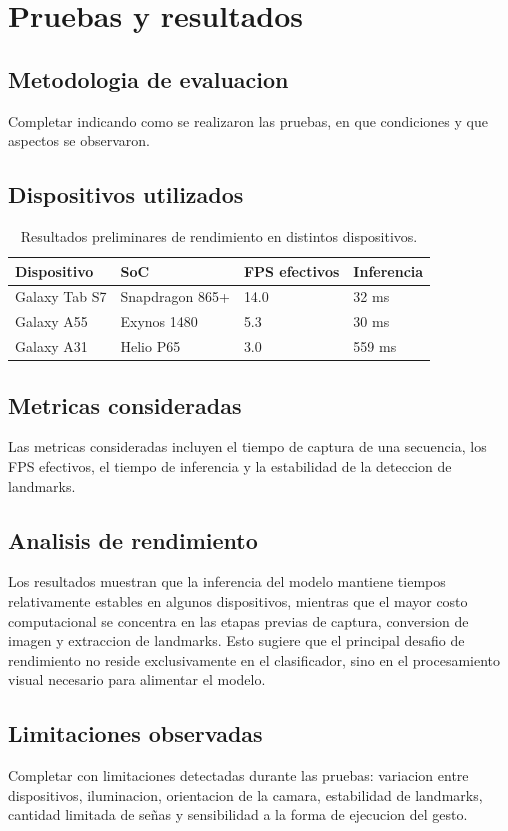 \chapter{Pruebas y resultados}

\section{Metodologia de evaluacion}

Completar indicando como se realizaron las pruebas, en que condiciones y que aspectos se observaron.

\section{Dispositivos utilizados}

\begin{table}[h]
    \centering
    \begin{tabular}{llll}
        \toprule
        Dispositivo & SoC & FPS efectivos & Inferencia \\
        \midrule
        Galaxy Tab S7 & Snapdragon 865+ & 14.0 & 32 ms \\
        Galaxy A55 & Exynos 1480 & 5.3 & 30 ms \\
        Galaxy A31 & Helio P65 & 3.0 & 559 ms \\
        \bottomrule
    \end{tabular}
    \caption{Resultados preliminares de rendimiento en distintos dispositivos.}
    \label{tab:rendimiento-dispositivos}
\end{table}

\section{Metricas consideradas}

Las metricas consideradas incluyen el tiempo de captura de una secuencia, los FPS efectivos, el tiempo de inferencia y la estabilidad de la deteccion de landmarks.

\section{Analisis de rendimiento}

Los resultados muestran que la inferencia del modelo mantiene tiempos relativamente estables en algunos dispositivos, mientras que el mayor costo computacional se concentra en las etapas previas de captura, conversion de imagen y extraccion de landmarks. Esto sugiere que el principal desafio de rendimiento no reside exclusivamente en el clasificador, sino en el procesamiento visual necesario para alimentar el modelo.

\section{Limitaciones observadas}

Completar con limitaciones detectadas durante las pruebas: variacion entre dispositivos, iluminacion, orientacion de la camara, estabilidad de landmarks, cantidad limitada de señas y sensibilidad a la forma de ejecucion del gesto.
